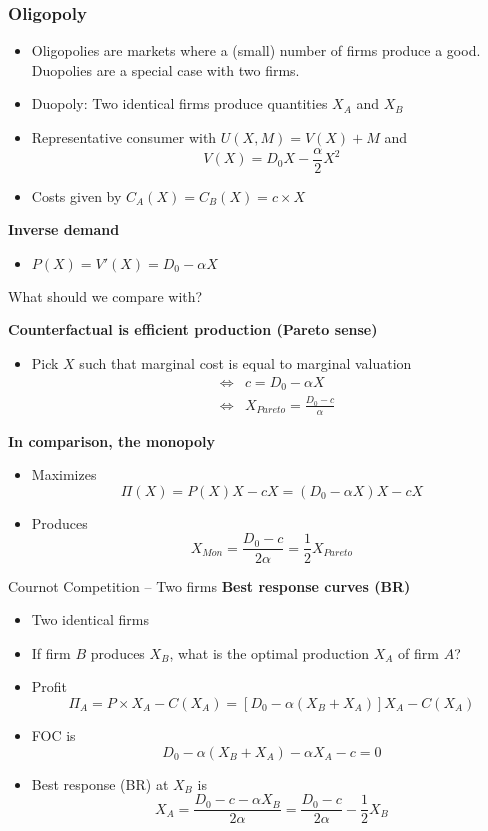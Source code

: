 \documentclass[handout]{beamer}
\newenvironment{iPar}[1]{\textbf{#1} \begin{itemize}}{\end{itemize}}
\newcommand{\mdp}{\medskip \pause}
\begin{document}
\begin{frame}\frametitle{Oligopoly} \begin{itemize} \item Oligopolies are markets where a (small) number of firms produce a good. Duopolies are a special case with two firms. 
\item Duopoly: Two identical firms produce quantities $X_A$ and $X_B$ \item Representative consumer with $U(X,M) =V(X) + M$ and $$ V(X) = D_0 X - \frac{\alpha}{2} X^2$$   \item Costs given by $C_A(X) = C_B(X)= c \times X$\end{itemize} \mdp

\begin{iPar}{Inverse demand}
\item  $P(X) = V'(X) = D_0 - \alpha X$
\end{iPar}
\end{frame}


\begin{frame}{What should we compare with?}

\begin{iPar}{Counterfactual is efficient production (Pareto sense)}
\item Pick $X$ such that marginal cost is equal to marginal valuation
\begin{eqnarray*} &\iff& c = D_0 - \alpha X \\ &\iff& X_{Pareto} = \frac{D_0 - c}{\alpha} \end{eqnarray*}
\end{iPar} \mdp

 
\begin{iPar}{In comparison, the monopoly }
\item Maximizes $$\Pi(X) =  P(X) X - c X = (D_0- \alpha X) X - c X$$
\item Produces $$X_{Mon} = \frac{D_0 - c}{2\alpha} = \frac{1}{2} X_{Pareto}$$

\end{iPar}

\end{frame}


\begin{frame}{Cournot Competition -- Two firms}
\begin{iPar}{Best response curves (BR)}
\item Two identical firms
\item If firm $B$ produces $X_B$, what is the optimal production $X_A$ of firm $A$? \pause
\item Profit $$\Pi_A = P \times X_A - C(X_A) = [D_0 - \alpha(X_B + X_A)]X_A - C(X_A)$$
\item FOC is $$ D_0 -   \alpha(X_B + X_A) - \alpha X_A - c  = 0$$
\item Best response (BR) at $X_B$ is  $$X_A = \frac{D_0 -  c - \alpha X_B}{ 2 \alpha} = \frac{D_0 - c}{2\alpha} - \frac{1}{2}X_B$$
\end{iPar}
\end{frame}
\end{document}
